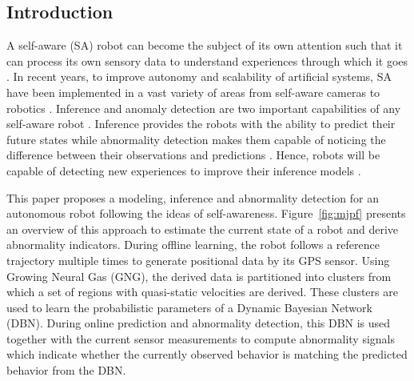 \documentclass{article}
\begin{document}
\begin{multicols}{2}

\section{Introduction}\label{sec:introduction}
    A self-aware (SA) robot can become the subject of its own attention such that it can process its own sensory data to understand experiences through which it goes  \cite{morin-2006-levels-of-consciousness-and-self-awareness-a-comparison-and-integration-of-various-neurocognitive-views}. In recent years, to improve autonomy and scalability of artificial systems, SA have been implemented in a vast variety of areas from self-aware cameras \cite{rinner-2015-self-aware-and-self-expressive-camera-networks} to robotics \cite{winfield-2014-robots-with-internal-models-a-route-to-self-aware-and-hence-safer-robots}. Inference and anomaly detection are two important capabilities of any self-aware robot \cite{regazzoni-2020-multi-sensorial-generative-and-descriptive-self-awareness-models-for-autonomous-systems}. Inference provides the robots  with the ability to predict their future states \cite{seth-2013-interoceptive-inference-emotion-and-the-embodied-self} while abnormality detection makes them capable of noticing the difference between their observations and predictions \cite{apps-2014-the-free-energy-self-a-predictive-coding-account-of-self-recognition}. Hence, robots will be capable of detecting new experiences to improve their inference models \cite{friston-2010-the-free-energy-principle-a-unified-brain-theory}. 
    
    This paper proposes a modeling, inference and abnormality detection for an autonomous robot following the ideas of self-awareness.
    Figure~\ref{fig:mjpf} presents an overview of this approach to estimate the current state of a robot and derive abnormality indicators. During offline learning, the robot follows a reference trajectory multiple times to generate positional data by its GPS sensor. Using Growing Neural Gas (GNG), the derived data is partitioned into clusters from which a set of regions with quasi-static velocities are derived. These clusters are used to learn the probabilistic parameters of a Dynamic Bayesian Network (DBN). During online prediction and abnormality detection, this DBN is used together with the current sensor measurements to compute abnormality signals which indicate whether the currently observed behavior is matching the predicted behavior from the DBN.  
    

\end{multicols}
\end{document}
